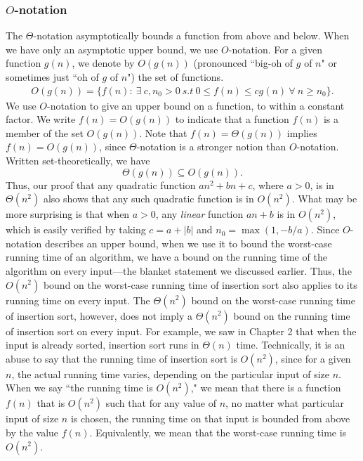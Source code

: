 \documentclass{report}
\begin{document}
        \bigbreak \noindent 
        \subsubsection{$O$-notation}
        \bigbreak \noindent 
        The $\Theta$-notation asymptotically bounds a function from above and below. When we have only an asymptotic upper bound, we use $O$-notation. For a given function $g(n)$, we denote by $O(g(n))$ (pronounced ``big-oh of $g$ of $n$" or sometimes just ``oh of $g$ of $n$") the set of functions.
        \begin{align*}
            O(g(n))  = \{f(n):\ \exists \ c,n_{0} > 0 \ s.t\ 0 \leq f(n) \leq cg(n) \ \forall \ n \geq n_{0}\}
        .\end{align*}
        \bigbreak \noindent 
        We use $O$-notation to give an upper bound on a function, to within a constant factor.
        \bigbreak \noindent 
        We write \( f(n) = O(g(n)) \) to indicate that a function \( f(n) \) is a member of the 
        set \( O(g(n)) \). Note that \( f(n) = \Theta(g(n)) \) implies \( f(n) = O(g(n)) \), since \(\Theta\)-notation is a stronger notion than \( O \)-notation. Written set-theoretically, we have 
        \[
            \Theta(g(n)) \subseteq O(g(n)).
        \]
        Thus, our proof that any quadratic function \( an^2 + bn + c \), where \( a > 0 \), is in \( \Theta(n^2) \) also shows that any such quadratic function is in \( O(n^2) \). 
        What may be more surprising is that when \( a > 0 \), any \textit{linear} function \( an + b \) is 
        in \( O(n^2) \), which is easily verified by taking \( c = a + |b| \) and \( n_0 = \max(1, -b/a) \).
        \bigbreak \noindent 
        Since $O$-notation describes an upper bound, when we use it to bound the worst-case running time of an algorithm, we have a bound on the running time of the algorithm on every input---the blanket statement we discussed earlier. Thus, the $O(n^2)$ bound on the worst-case running time of insertion sort also applies to its running time on every input. The $\Theta(n^2)$ bound on the worst-case running time of insertion sort, however, does not imply a $\Theta(n^2)$ bound on the running time of insertion sort on every input. For example, we saw in Chapter 2 that when the input is already sorted, insertion sort runs in $\Theta(n)$ time.
        \bigbreak \noindent 
        Technically, it is an abuse to say that the running time of insertion sort is $O(n^2)$, since for a given $n$, the actual running time varies, depending on the particular input of size $n$. When we say ``the running time is $O(n^2)$," we mean that there is a function $f(n)$ that is $O(n^2)$ such that for any value of $n$, no matter what particular input of size $n$ is chosen, the running time on that input is bounded from above by the value $f(n)$. Equivalently, we mean that the worst-case running time is $O(n^2)$.
\end{document}
